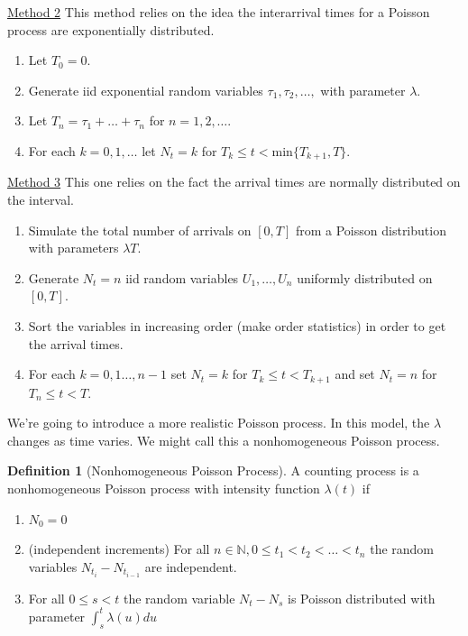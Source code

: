 \documentclass[12pt]{article}
\theoremstyle{definition}
\newtheorem{definition}{Definition}[section]
\begin{document}
  \underline{Method 2}
  This method relies on the idea the interarrival times for a Poisson process are exponentially distributed.

  \begin{enumerate}
    \item Let $T_0 = 0$.
    \item Generate iid exponential random variables $\tau_1, \tau_2, \dots,$ with parameter $\lambda$.
    \item Let $T_n = \tau_1 + \dots + \tau_n$ for $n = 1, 2, \dots$.
    \item For each $k = 0, 1, \dots$ let $N_t = k$ for $T_k \leq t < \text{min}\{T_{k+1}, T\}$.
  \end{enumerate}

  \underline{Method 3}
  This one relies on the fact the arrival times are normally distributed on the interval.

  \begin{enumerate}
    \item Simulate the total number of arrivals on $[0,T]$ from a Poisson distribution with parameters $\lambda T$.
    \item Generate $N_t = n$ iid random variables $U_1, \dots, U_n$ uniformly distributed on $[0,T]$.
    \item Sort the variables in increasing order (make order statistics) in order to get the arrival times.
    \item For each $k = 0, 1 \dots, n-1$ set $N_t = k$ for $T_k \leq t < T_{k+1}$ and set $N_t = n$ for $T_n \leq t < T$.
  \end{enumerate}

We're going to introduce a more realistic Poisson process. In this model, the $
\lambda$ changes as time varies. We might call this a nonhomogeneous Poisson process.

\begin{definition}[Nonhomogeneous Poisson Process]

  A counting process is a nonhomogeneous Poisson process with intensity function $\lambda(t)$ if
  \begin{enumerate}
    \item $N_0 = 0$
    \item (independent increments) For all $n \in \mathbb{N}, 0 \leq t_1 < t_2 < \dots < t_{n}$ the random variables $N_{t_i} - N_{t_{i-1}}$ are independent.
    \item For all $0 \leq s < t$ the random variable $N_t - N_s$ is Poisson distributed with parameter $\int_{s}^t \lambda(u) du $
  \end{enumerate}

\end{definition}
\end{document}
